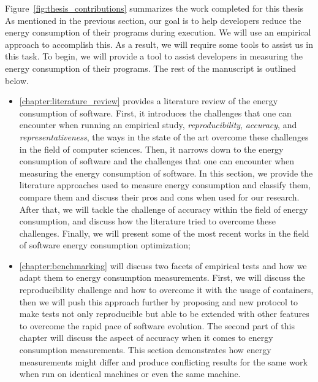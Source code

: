 Figure~\ref{fig:thesis_contributions} summarizes the work completed for this thesis As mentioned in the previous section, our goal is to help developers reduce the energy consumption of their programs during execution.
We will use an empirical approach to accomplish this.
As a result, we will require some tools to assist us in this task.
To begin, we will provide a tool to assist developers in measuring the energy consumption of their programs.
The rest of the manuscript is outlined below.

\begin{itemize}
    \item \cref{chapter:literature_review} provides a literature review of the energy consumption of software.
          First, it introduces the challenges that one can encounter when running an empirical study, \emph{reproducibility}, \emph{accuracy}, and \emph{representativeness}, the ways in the state of the art overcome these challenges in the field of computer sciences.
          Then, it narrows down to the energy consumption of software and the challenges that one can encounter when measuring the energy consumption of software.
          In this section, we provide the literature approaches used to measure energy consumption and classify them, compare them and discuss their pros and cons when used for our research. After that, we will tackle the challenge of accuracy within the field of energy consumption, and discuss how the literature tried to overcome these challenges. Finally, we will present some of the most recent works in the field of software energy consumption optimization;
    \item \cref{chapter:benchmarking} will discuss two facets of empirical tests and how we adapt them to energy consumption measurements.
          First, we will discuss the reproducibility challenge and how to overcome it with the usage of containers, then we will push this approach further by proposing and new protocol to make tests not only reproducible but able to be extended with other features to overcome the rapid pace of software evolution.
          The second part of this chapter will discuss the aspect of accuracy when it comes to energy consumption measurements.
          This section demonstrates how energy measurements might differ and produce conflicting results for the same work when run on identical machines or even the same machine.

\end{itemize}
